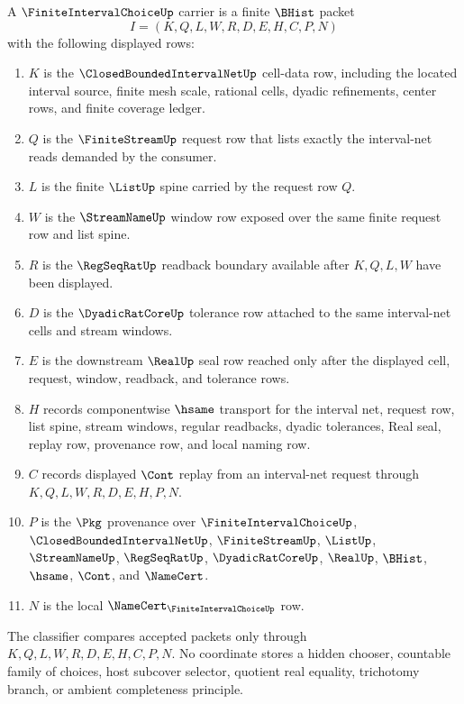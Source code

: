 \begin{definition}
\label{def:finite-interval-choice-carrier}
A $\FiniteIntervalChoiceUp$ carrier is a finite $\BHist$ packet
$$
I=(K,Q,L,W,R,D,E,H,C,P,N)
$$
with the following displayed rows:
\begin{enumerate}
\item $K$ is the $\ClosedBoundedIntervalNetUp$ cell-data row, including the located interval source, finite mesh scale, rational cells, dyadic refinements, center rows, and finite coverage ledger.
\item $Q$ is the $\FiniteStreamUp$ request row that lists exactly the interval-net reads demanded by the consumer.
\item $L$ is the finite $\ListUp$ spine carried by the request row $Q$.
\item $W$ is the $\StreamNameUp$ window row exposed over the same finite request row and list spine.
\item $R$ is the $\RegSeqRatUp$ readback boundary available after $K,Q,L,W$ have been displayed.
\item $D$ is the $\DyadicRatCoreUp$ tolerance row attached to the same interval-net cells and stream windows.
\item $E$ is the downstream $\RealUp$ seal row reached only after the displayed cell, request, window, readback, and tolerance rows.
\item $H$ records componentwise $\hsame$ transport for the interval net, request row, list spine, stream windows, regular readbacks, dyadic tolerances, Real seal, replay row, provenance row, and local naming row.
\item $C$ records displayed $\Cont$ replay from an interval-net request through $K,Q,L,W,R,D,E,H,P,N$.
\item $P$ is the $\Pkg$ provenance over $\FiniteIntervalChoiceUp$, $\ClosedBoundedIntervalNetUp$, $\FiniteStreamUp$, $\ListUp$, $\StreamNameUp$, $\RegSeqRatUp$, $\DyadicRatCoreUp$, $\RealUp$, $\BHist$, $\hsame$, $\Cont$, and $\NameCert$.
\item $N$ is the local $\NameCert_{\FiniteIntervalChoiceUp}$ row.
\end{enumerate}
The classifier compares accepted packets only through $K,Q,L,W,R,D,E,H,C,P,N$. No coordinate stores a hidden chooser, countable family of choices, host subcover selector, quotient real equality, trichotomy branch, or ambient completeness principle.
\end{definition}


